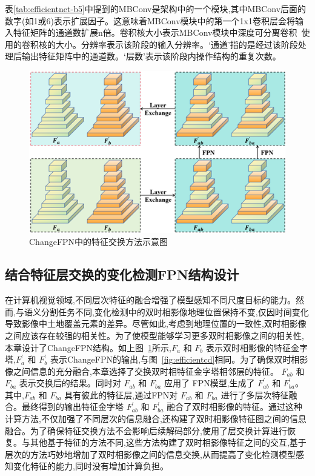表\ref{tab:efficientnet-b5}中提到的MBConv是架构中的一个模块,其中MBConv后面的数字(如1或6)表示扩展因子。这意味着MBConv模块中的第一个1x1卷积层会将输入特征矩阵的通道数扩展n倍。卷积核大小表示MBConv模块中深度可分离卷积~\cite{Chollet2016XceptionDL}使用的卷积核的大小。分辨率表示该阶段的输入分辨率。‘通道’指的是经过该阶段处理后输出特征矩阵中的通道数。‘层数’表示该阶段内操作结构的重复次数。

\begin{figure}[!htbp]
  \centering
  \includegraphics[width=\textwidth]{paper_figures/基于双时相遥感影像特征交互的变化检测算法研究/EfficientCD/efficientcd_changefpn.png}
  \caption{ChangeFPN中的特征交换方法示意图}
  \label{fig:efficientcd_changefpn}
\end{figure}

\subsection{结合特征层交换的变化检测FPN结构设计}

在计算机视觉领域,不同层次特征的融合增强了模型感知不同尺度目标的能力。然而,与语义分割任务不同,变化检测中的双时相影像地理位置保持不变,仅因时间变化导致影像中土地覆盖元素的差异。尽管如此,考虑到地理位置的一致性,双时相影像之间应该存在较强的相关性。为了使模型能够学习更多双时相影像之间的相关性,本章设计了ChangeFPN结构。如上图~\ref{fig:efficientcd_changefpn}所示,$F_{a}$ 和 $F_{b}$ 表示双时相影像的特征金字塔,${F}_{a}^{\prime}$ 和 ${F}_{b}^{\prime}$ 表示ChangeFPN的输出,与图~\ref{fig:efficientcd}相同。为了确保双时相影像之间信息的充分融合,本章选择了交换双时相特征金字塔相邻层的特征。 $F_{ab}$ 和 $F_{ba}$ 表示交换后的结果。同时对 $F_{ab}$ 和 $F_{ba}$ 应用了 FPN模型,生成了 ${F}_{ab}^{\prime}$ 和 ${F}_{ba}^{\prime}$。其中,$F_{ab}$ 和 $F_{ba}$ 具有彼此的特征层,通过FPN对 $F_{ab}$ 和 $F_{ba}$ 进行了多层次特征融合。最终得到的输出特征金字塔 ${F}_{ab}^{\prime}$ 和 ${F}_{ba}^{\prime}$ 融合了双时相影像的特征。通过这种计算方法,不仅加强了不同层次的信息融合,还构建了双时相影像特征图之间的信息融合。为了确保特征交换方法不会影响后续解码部分,使用了层交换计算进行恢复。与其他基于特征的方法不同,这些方法构建了双时相影像特征之间的交互,基于层次的方法巧妙地增加了双时相影像之间的信息交换,从而提高了变化检测模型感知变化特征的能力,同时没有增加计算负担。

